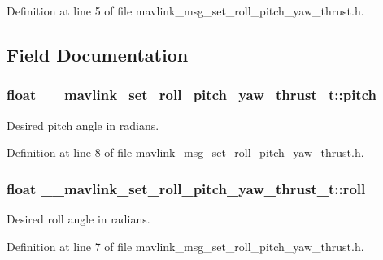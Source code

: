 Definition at line 5 of file mavlink\-\_\-msg\-\_\-set\-\_\-roll\-\_\-pitch\-\_\-yaw\-\_\-thrust.\-h.



\subsection{Field Documentation}
\hypertarget{struct____mavlink__set__roll__pitch__yaw__thrust__t_af2758db0f0b898ef21ac0a910a32aa83}{
\subsubsection[{pitch}]{\setlength{\rightskip}{0pt plus 5cm}float \-\_\-\-\_\-mavlink\-\_\-set\-\_\-roll\-\_\-pitch\-\_\-yaw\-\_\-thrust\-\_\-t\-::pitch}}\label{struct____mavlink__set__roll__pitch__yaw__thrust__t_af2758db0f0b898ef21ac0a910a32aa83}


Desired pitch angle in radians. 



Definition at line 8 of file mavlink\-\_\-msg\-\_\-set\-\_\-roll\-\_\-pitch\-\_\-yaw\-\_\-thrust.\-h.

\hypertarget{struct____mavlink__set__roll__pitch__yaw__thrust__t_ac22187a5d5cf4d397c64916dfb1ebe8d}{
\subsubsection[{roll}]{\setlength{\rightskip}{0pt plus 5cm}float \-\_\-\-\_\-mavlink\-\_\-set\-\_\-roll\-\_\-pitch\-\_\-yaw\-\_\-thrust\-\_\-t\-::roll}}\label{struct____mavlink__set__roll__pitch__yaw__thrust__t_ac22187a5d5cf4d397c64916dfb1ebe8d}


Desired roll angle in radians. 



Definition at line 7 of file mavlink\-\_\-msg\-\_\-set\-\_\-roll\-\_\-pitch\-\_\-yaw\-\_\-thrust.\-h.

